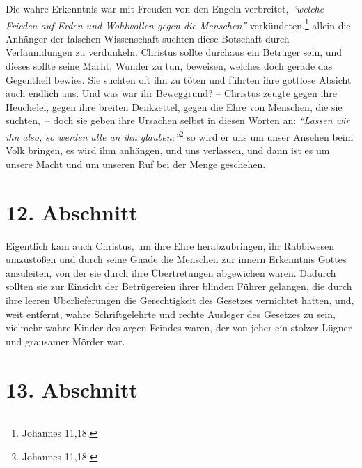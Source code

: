Die wahre Erkenntnis war mit Freuden von den
Engeln verbreitet, \textit{"`welche Frieden auf Erden
und Wohlwollen gegen die Menschen"'}
verkündeten,\footnote{Johannes 11,18.}
allein die Anhänger der falschen Wissenschaft
suchten diese Botschaft durch Verläumdungen zu verdunkeln. Christus sollte
durchaus ein Betrüger sein, und dieses sollte seine Macht, Wunder
zu tun,
beweisen, welches doch gerade das Gegentheil bewies. Sie suchten oft ihn zu
töten und führten ihre gottlose Absicht auch endlich aus. Und was war ihr
Beweggrund? -- Christus zeugte gegen ihre Heuchelei, gegen ihre
breiten
Denkzettel, gegen die Ehre von Menschen, die sie suchten,~-- doch sie geben ihre
Ursachen selbst in diesen Worten an:
\textit{"`Lassen wir ihn also, so werden alle an ihn
glauben;"'}\footnote{Johannes 11,18.}
so wird er uns um unser Ansehen beim Volk
bringen, es wird ihm anhängen, und uns verlassen, und dann ist es um unsere
Macht und um unseren Ruf bei der Menge geschehen.

\section{12. Abschnitt} \label{kap7_ab12}

Eigentlich kam auch Christus, um ihre Ehre herabzubringen, ihr Rabbiwesen
umzustoßen und durch seine Gnade die Menschen zur innern Erkenntnis Gottes
anzuleiten, von der sie durch ihre Übertretungen abgewichen waren. Dadurch
sollten sie zur Einsicht der Betrügereien ihrer blinden
Führer gelangen, die
durch ihre leeren Überlieferungen die Gerechtigkeit des
Gesetzes vernichtet
hatten, und, weit entfernt, wahre Schriftgelehrte und rechte Ausleger des
Gesetzes zu sein, vielmehr wahre Kinder des argen Feindes waren, der von jeher
ein stolzer Lügner und grausamer Mörder war.

\section{13. Abschnitt} \label{kap7_ab13}

